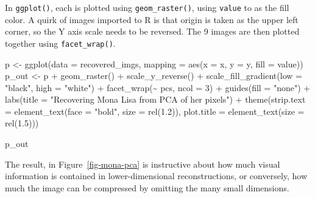 \documentclass[
  letterpaper,
  10pt,
  krantz2]{krantz}
\makeatletter
\newenvironment{Shaded}{\begin{snugshade}}{\end{snugshade}}
\newcommand{\AttributeTok}[1]{\textcolor[rgb]{0.40,0.45,0.13}{#1}}
\newcommand{\DecValTok}[1]{\textcolor[rgb]{0.68,0.00,0.00}{#1}}
\newcommand{\FloatTok}[1]{\textcolor[rgb]{0.68,0.00,0.00}{#1}}
\newcommand{\FunctionTok}[1]{\textcolor[rgb]{0.28,0.35,0.67}{#1}}
\newcommand{\NormalTok}[1]{\textcolor[rgb]{0.00,0.23,0.31}{#1}}
\newcommand{\OtherTok}[1]{\textcolor[rgb]{0.00,0.23,0.31}{#1}}
\newcommand{\SpecialCharTok}[1]{\textcolor[rgb]{0.37,0.37,0.37}{#1}}
\newcommand{\StringTok}[1]{\textcolor[rgb]{0.13,0.47,0.30}{#1}}
\newenvironment{kframe}{%
  \medskip{}
  \setlength{\fboxsep}{.8em}
  \def\at@end@of@kframe{}%
  \ifinner\ifhmode%
  \def\at@end@of@kframe{\end{minipage}}%
  \begin{minipage}{\columnwidth}%
  \fi\fi%
  \def\FrameCommand##1{\hskip\@totalleftmargin \hskip-\fboxsep
  \colorbox{shadecolor}{##1}\hskip-\fboxsep
      \hskip-\linewidth \hskip-\@totalleftmargin \hskip\columnwidth}%
  \MakeFramed {\advance\hsize-\width
    \@totalleftmargin\z@ \linewidth\hsize
    \@setminipage}}%
{\par\unskip\endMakeFramed%
  \at@end@of@kframe}
\renewenvironment{Shaded}{\begin{kframe}}{\end{kframe}}
\makeatother
\begin{document}
In \texttt{ggplot()}, each is plotted using \texttt{geom\_raster()},
using \texttt{value} to as the fill color. A quirk of images imported to
R is that origin is taken as the upper left corner, so the Y axis scale
needs to be reversed. The 9 images are then plotted together using
\texttt{facet\_wrap()}.

\begin{Shaded}
\begin{Highlighting}[]
\NormalTok{p }\OtherTok{\textless{}{-}} \FunctionTok{ggplot}\NormalTok{(}\AttributeTok{data =}\NormalTok{ recovered\_imgs, }
            \AttributeTok{mapping =} \FunctionTok{aes}\NormalTok{(}\AttributeTok{x =}\NormalTok{ x, }\AttributeTok{y =}\NormalTok{ y, }\AttributeTok{fill =}\NormalTok{ value))}
\NormalTok{p\_out }\OtherTok{\textless{}{-}}\NormalTok{ p }\SpecialCharTok{+} \FunctionTok{geom\_raster}\NormalTok{() }\SpecialCharTok{+} 
  \FunctionTok{scale\_y\_reverse}\NormalTok{() }\SpecialCharTok{+} 
  \FunctionTok{scale\_fill\_gradient}\NormalTok{(}\AttributeTok{low =} \StringTok{"black"}\NormalTok{, }\AttributeTok{high =} \StringTok{"white"}\NormalTok{) }\SpecialCharTok{+}
  \FunctionTok{facet\_wrap}\NormalTok{(}\SpecialCharTok{\textasciitilde{}}\NormalTok{ pcs, }\AttributeTok{ncol =} \DecValTok{3}\NormalTok{) }\SpecialCharTok{+} 
  \FunctionTok{guides}\NormalTok{(}\AttributeTok{fill =} \StringTok{"none"}\NormalTok{) }\SpecialCharTok{+} 
  \FunctionTok{labs}\NormalTok{(}\AttributeTok{title =} \StringTok{"Recovering Mona Lisa from PCA of her pixels"}\NormalTok{) }\SpecialCharTok{+} 
  \FunctionTok{theme}\NormalTok{(}\AttributeTok{strip.text =} \FunctionTok{element\_text}\NormalTok{(}\AttributeTok{face =} \StringTok{"bold"}\NormalTok{, }\AttributeTok{size =} \FunctionTok{rel}\NormalTok{(}\FloatTok{1.2}\NormalTok{)),}
        \AttributeTok{plot.title =} \FunctionTok{element\_text}\NormalTok{(}\AttributeTok{size =} \FunctionTok{rel}\NormalTok{(}\FloatTok{1.5}\NormalTok{)))}

\NormalTok{p\_out}
\end{Highlighting}
\end{Shaded}

The result, in Figure~\ref{fig-mona-pca} is instructive about how much
visual information is contained in lower-dimensional reconstructions, or
conversely, how much the image can be compressed by omitting the many
small dimensions.
\end{document}
